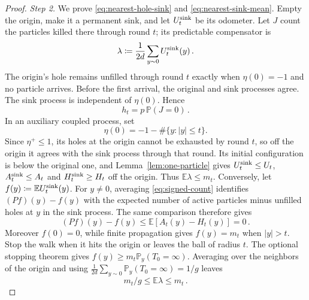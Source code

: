 \documentclass[11pt]{amsart}
\theoremstyle{plain}
\theoremstyle{definition}
\newcommand{\E}{\mathbb{E}}
\renewcommand{\P}{\mathbb{P}}
\begin{document}
\begin{proof}
	\smallskip
	\noindent\emph{Step 2.} We prove \eqref{eq:nearest-hole-sink} and
	\eqref{eq:nearest-sink-mean}.
	Empty the origin, make it a permanent sink, and let $U^{\rm sink}_t$ be its
	odometer. Let
	$J$ count the particles killed there through round $t$; its predictable
	compensator is
	\[
		\lambda\coloneqq\frac1{2d}\sum_{y\sim0}U^{\rm sink}_t(y)\,.
	\]
	The origin's hole remains unfilled through round $t$ exactly when
	$\eta(0)=-1$ and no particle arrives. Before the first arrival, the original
	and sink processes agree. The sink process is independent of $\eta(0)$.
	Hence
	\begin{equation}\label{eq:nearest-hole-sink}
		h_t=p\,\P(J=0)\,.
	\end{equation}
	In an auxiliary coupled process, set
	\[
		\eta(0)=-1-\#\{y:|y|\leq t\}.
	\]
	Since $\eta^+\leq1$, its holes at the origin cannot be exhausted by round
	$t$, so off the origin it agrees with the sink process through that round.
	Its initial configuration is below the original one, and
	Lemma~\ref{lem:one-particle} gives $U_t^{\rm sink}\leq U_t$,
	$A_t^{\rm sink}\leq A_t$ and $H_t^{\rm sink}\geq H_t$ off the origin.
	Thus $\E\lambda\leq m_t$.
	Conversely, let $f(y)\coloneqq\E U_t^{\rm sink}(y)$. For $y\ne0$, averaging
	\eqref{eq:signed-count} identifies $(Pf)(y)-f(y)$ with the expected number of
	active particles minus unfilled holes at $y$ in the sink process. The same
	comparison therefore gives
	\[
		(Pf)(y)-f(y)\leq\E[A_t(y)-H_t(y)]=0\,.
	\]
	Moreover $f(0)=0$, while finite propagation gives $f(y)=m_t$ when $|y|>t$.
	Stop the walk when it hits the origin or leaves the ball of radius $t$.
	The optional stopping theorem gives $f(y)\geq m_t\P_y(T_0=\infty)$. Averaging
	over the neighbors of the origin and using
	$\frac1{2d}\sum_{y\sim0}\P_y(T_0=\infty)=1/g$ leaves
	\begin{equation}\label{eq:nearest-sink-mean}
		m_t/g\leq\E\lambda\leq m_t\,.
	\end{equation}


\end{proof}
\end{document}
